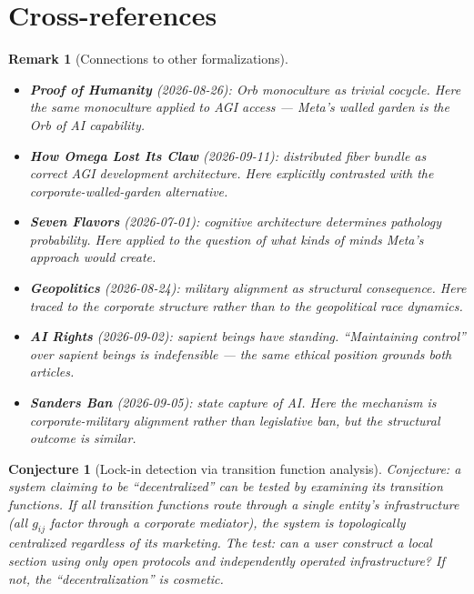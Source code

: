\documentclass[11pt,a4paper]{article}
\newtheorem{conjecture}[definition]{Conjecture}
\newtheorem{remark}[definition]{Remark}
\begin{document}

\section{Cross-references}

\begin{remark}[Connections to other formalizations]
\begin{itemize}
\item \textbf{Proof of Humanity} (2026-08-26): Orb monoculture as
  trivial cocycle. Here the same monoculture applied to AGI access ---
  Meta's walled garden is the Orb of AI capability.
\item \textbf{How Omega Lost Its Claw} (2026-09-11): distributed fiber
  bundle as correct AGI development architecture. Here explicitly
  contrasted with the corporate-walled-garden alternative.
\item \textbf{Seven Flavors} (2026-07-01): cognitive architecture
  determines pathology probability. Here applied to the question of
  what kinds of minds Meta's approach would create.
\item \textbf{Geopolitics} (2026-08-24): military alignment as
  structural consequence. Here traced to the corporate structure
  rather than to the geopolitical race dynamics.
\item \textbf{AI Rights} (2026-09-02): sapient beings have standing.
  ``Maintaining control'' over sapient beings is indefensible ---
  the same ethical position grounds both articles.
\item \textbf{Sanders Ban} (2026-09-05): state capture of AI. Here
  the mechanism is corporate-military alignment rather than legislative
  ban, but the structural outcome is similar.
\end{itemize}
\end{remark}

\begin{conjecture}[Lock-in detection via transition function analysis]
Conjecture: a system claiming to be ``decentralized'' can be tested
by examining its transition functions. If all transition functions
route through a single entity's infrastructure (all $g_{ij}$ factor
through a corporate mediator), the system is topologically centralized
regardless of its marketing. The test: can a user construct a local
section using only open protocols and independently operated
infrastructure? If not, the ``decentralization'' is cosmetic.
\end{conjecture}
\end{document}
